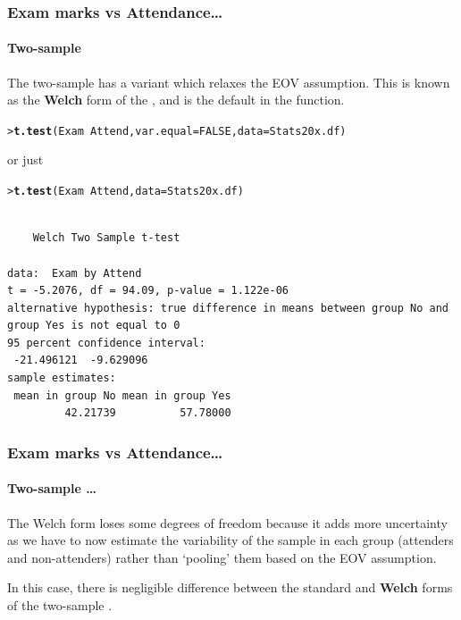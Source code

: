 \documentclass{beamer}\usepackage[]{graphicx}\usepackage[]{xcolor}
\makeatletter
\newcommand{\hlnum}[1]{\textcolor[rgb]{0.686,0.059,0.569}{#1}}%
\newcommand{\hlopt}[1]{\textcolor[rgb]{0,0,0}{#1}}%
\newcommand{\hlstd}[1]{\textcolor[rgb]{0.345,0.345,0.345}{#1}}%
\newcommand{\hlkwc}[1]{\textcolor[rgb]{0.333,0.667,0.333}{#1}}%
\newcommand{\hlkwd}[1]{\textcolor[rgb]{0.737,0.353,0.396}{\textbf{#1}}}%
\newenvironment{kframe}{%
 \def\at@end@of@kframe{}%
 \ifinner\ifhmode%
  \def\at@end@of@kframe{\end{minipage}}%
  \begin{minipage}{\columnwidth}%
 \fi\fi%
 \def\FrameCommand##1{\hskip\@totalleftmargin \hskip-\fboxsep
 \colorbox{shadecolor}{##1}\hskip-\fboxsep
     \hskip-\linewidth \hskip-\@totalleftmargin \hskip\columnwidth}%
 \MakeFramed {\advance\hsize-\width
   \@totalleftmargin\z@ \linewidth\hsize
   \@setminipage}}%
 {\par\unskip\endMakeFramed%
 \at@end@of@kframe}
\newenvironment{knitrout}{}{} %
\makeatother
\begin{document}
\begin{frame}[fragile]
\frametitle{Exam marks vs Attendance\ldots}
\framesubtitle{Two-sample \ttest{}}

The two-sample \ttest{} has a variant which relaxes the EOV assumption.
This is known as the \textbf{Welch} form of the \ttest{}, 
and is the default in the  function.  

\begin{knitrout}\scriptsize
{}\color{fgcolor}\begin{kframe}
\begin{alltt}
\hlstd{> }\hlkwd{t.test}\hlstd{(Exam}\hlopt{~} \hlstd{Attend,} \hlkwc{var.equal}\hlstd{=}\hlnum{FALSE}\hlstd{,} \hlkwc{data} \hlstd{= Stats20x.df)}
\end{alltt}
\end{kframe}
\end{knitrout}
or just
\begin{knitrout}\scriptsize
{}\color{fgcolor}\begin{kframe}
\begin{alltt}
\hlstd{> }\hlkwd{t.test}\hlstd{(Exam}\hlopt{~} \hlstd{Attend,} \hlkwc{data} \hlstd{= Stats20x.df)}
\end{alltt}
\begin{verbatim}

	Welch Two Sample t-test

data:  Exam by Attend
t = -5.2076, df = 94.09, p-value = 1.122e-06
alternative hypothesis: true difference in means between group No and group Yes is not equal to 0
95 percent confidence interval:
 -21.496121  -9.629096
sample estimates:
 mean in group No mean in group Yes 
         42.21739          57.78000 
\end{verbatim}
\end{kframe}
\end{knitrout}
\end{frame}


\begin{frame}[fragile]
\frametitle{Exam marks vs Attendance\ldots}
\framesubtitle{Two-sample \ttest{}\ldots}
The Welch form loses some degrees of freedom because it 
adds more uncertainty as we have to now estimate the variability of the sample in each group (attenders and non-attenders) rather than `pooling' them based on the EOV assumption. 

\bigskip

In this case, there is negligible difference between the standard and \textbf{Welch} forms of
the two-sample \ttest{}.

\end{frame}
\end{document}
